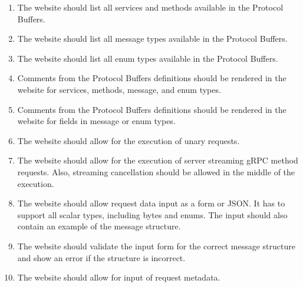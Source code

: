 \begin{enumerate}[label=\textbf{F\arabic*}, labelwidth=!, labelsep=*, align=left, leftmargin=*]
    \item {}
    The website should list all services and methods available in the Protocol Buffers.

    \item {}
    The website should list all message types available in the Protocol Buffers.

    \item {}
    The website should list all enum types available in the Protocol Buffers.

    \item {}
    Comments from the Protocol Buffers definitions should be rendered in the website for services, methods, message, and enum types.

    \item {}
    Comments from the Protocol Buffers definitions should be rendered in the website for fields in message or enum types.

    \item {}
    The website should allow for the execution of unary requests.

    \item {}
    The website should allow for the execution of server streaming gRPC method requests.
    Also, streaming cancellation should be allowed in the middle of the execution.

    \item {}
    The website should allow request data input as a form or JSON\@.
    It has to support all scalar types, including bytes and enums.
    The input should also contain an example of the message structure.

    \item {}
    The website should validate the input form for the correct message structure and show an error if the structure is incorrect.

    \item {}
    The website should allow for input of request metadata.


\end{enumerate}
